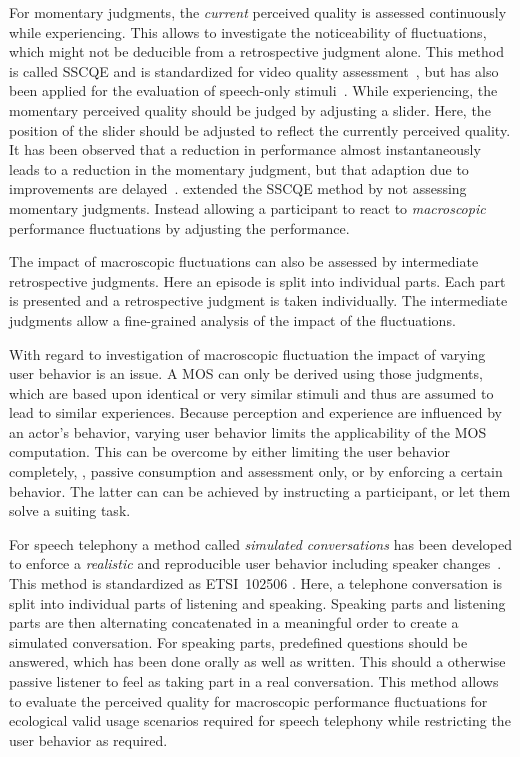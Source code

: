 For momentary judgments, the \emph{current} perceived quality is assessed continuously while experiencing.
This allows to investigate the noticeability of fluctuations, which might not be deducible from a retrospective judgment alone.
This method is called \ac{SSCQE} and is standardized for video quality assessment~\citep[][]{itu-r_recommendation_bt.500-13_methodology_2012}, but has also been applied for the evaluation of speech-only stimuli~\cite[\eg,][]{gros_instantaneous_2001}.
While experiencing, the momentary perceived quality should be judged by adjusting a slider.
Here, the position of the slider should be adjusted to reflect the currently perceived quality.
It has been observed that a reduction in performance almost instantaneously leads to a reduction in the momentary judgment, but that adaption due to improvements are delayed~\citep[\eg,][]{hands_recency_2001, gros_instantaneous_2001, hamberg_time-varying_1999}.
\citet{borowiak_long_2013} extended the \ac{SSCQE} method by not assessing momentary judgments.
Instead allowing a participant to react to \emph{macroscopic} performance fluctuations by adjusting the performance.

The impact of macroscopic fluctuations can also be assessed by intermediate retrospective judgments.
Here an episode is split into individual parts.
Each part is presented and a retrospective judgment is taken individually.
The intermediate judgments allow a fine-grained analysis of the impact of the fluctuations.

With regard to investigation of macroscopic fluctuation the impact of varying user behavior is an issue.
A \ac{MOS} can only be derived using those judgments, which are based upon identical or very similar stimuli and thus are assumed to lead to similar experiences.
Because perception and experience are influenced by an actor's behavior, varying user behavior limits the applicability of the \ac{MOS} computation.
This can be overcome by either limiting the user behavior completely, \ie, passive consumption and assessment only, or by enforcing a certain behavior.
The latter can can be achieved by instructing a participant, or let them solve a suiting task.

For speech telephony a method called \emph{simulated conversations} has been developed to enforce a \emph{realistic} and reproducible user behavior including speaker changes~\citep{weiss_modeling_2009, berger_estimation_2008}.
This method is standardized as ETSI~102506 \citep{etsi_speech_2011}.
Here, a telephone conversation is split into individual parts of listening and speaking.
Speaking parts and listening parts are then alternating concatenated in a meaningful order to create a simulated conversation.
For speaking parts, predefined questions should be answered, which has been done orally as well as written.
This should a otherwise passive listener to feel as taking part in a real conversation.
This method allows to evaluate the perceived quality for macroscopic performance fluctuations for ecological valid usage scenarios required for speech telephony while restricting the user behavior as required.

